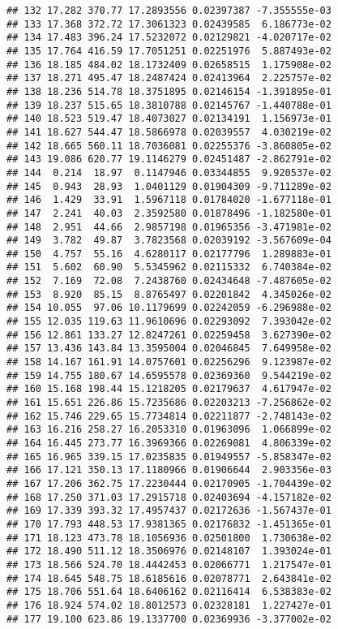 \documentclass[]{book}
\theoremstyle{definition}
\theoremstyle{definition}
\theoremstyle{definition}
\theoremstyle{remark}
\begin{document}
\begin{verbatim}
## 132 17.282 370.77 17.2893556 0.02397387 -7.355555e-03
## 133 17.368 372.72 17.3061323 0.02439585  6.186773e-02
## 134 17.483 396.24 17.5232072 0.02129821 -4.020717e-02
## 135 17.764 416.59 17.7051251 0.02251976  5.887493e-02
## 136 18.185 484.02 18.1732409 0.02658515  1.175908e-02
## 137 18.271 495.47 18.2487424 0.02413964  2.225757e-02
## 138 18.236 514.78 18.3751895 0.02146154 -1.391895e-01
## 139 18.237 515.65 18.3810788 0.02145767 -1.440788e-01
## 140 18.523 519.47 18.4073027 0.02134191  1.156973e-01
## 141 18.627 544.47 18.5866978 0.02039557  4.030219e-02
## 142 18.665 560.11 18.7036081 0.02255376 -3.860805e-02
## 143 19.086 620.77 19.1146279 0.02451487 -2.862791e-02
## 144  0.214  18.97  0.1147946 0.03344855  9.920537e-02
## 145  0.943  28.93  1.0401129 0.01904309 -9.711289e-02
## 146  1.429  33.91  1.5967118 0.01784020 -1.677118e-01
## 147  2.241  40.03  2.3592580 0.01878496 -1.182580e-01
## 148  2.951  44.66  2.9857198 0.01965356 -3.471981e-02
## 149  3.782  49.87  3.7823568 0.02039192 -3.567609e-04
## 150  4.757  55.16  4.6280117 0.02177796  1.289883e-01
## 151  5.602  60.90  5.5345962 0.02115332  6.740384e-02
## 152  7.169  72.08  7.2438760 0.02434648 -7.487605e-02
## 153  8.920  85.15  8.8765497 0.02201842  4.345026e-02
## 154 10.055  97.06 10.1179699 0.02242059 -6.296988e-02
## 155 12.035 119.63 11.9610696 0.02293092  7.393042e-02
## 156 12.861 133.27 12.8247261 0.02259458  3.627390e-02
## 157 13.436 143.84 13.3595004 0.02046845  7.649958e-02
## 158 14.167 161.91 14.0757601 0.02256296  9.123987e-02
## 159 14.755 180.67 14.6595578 0.02369360  9.544219e-02
## 160 15.168 198.44 15.1218205 0.02179637  4.617947e-02
## 161 15.651 226.86 15.7235686 0.02203213 -7.256862e-02
## 162 15.746 229.65 15.7734814 0.02211877 -2.748143e-02
## 163 16.216 258.27 16.2053310 0.01963096  1.066899e-02
## 164 16.445 273.77 16.3969366 0.02269081  4.806339e-02
## 165 16.965 339.15 17.0235835 0.01949557 -5.858347e-02
## 166 17.121 350.13 17.1180966 0.01906644  2.903356e-03
## 167 17.206 362.75 17.2230444 0.02170905 -1.704439e-02
## 168 17.250 371.03 17.2915718 0.02403694 -4.157182e-02
## 169 17.339 393.32 17.4957437 0.02172636 -1.567437e-01
## 170 17.793 448.53 17.9381365 0.02176832 -1.451365e-01
## 171 18.123 473.78 18.1056936 0.02501800  1.730638e-02
## 172 18.490 511.12 18.3506976 0.02148107  1.393024e-01
## 173 18.566 524.70 18.4442453 0.02066771  1.217547e-01
## 174 18.645 548.75 18.6185616 0.02078771  2.643841e-02
## 175 18.706 551.64 18.6406162 0.02116414  6.538383e-02
## 176 18.924 574.02 18.8012573 0.02328181  1.227427e-01
## 177 19.100 623.86 19.1337700 0.02369936 -3.377002e-02

\end{verbatim}
\end{document}
